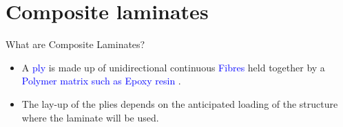 \documentclass[10pt,aspectratio=169,dvipsnames]{beamer} %
\begin{document}
\section{Composite laminates}
\begin{frame}{What are Composite Laminates?}
	\begin{minipage}[c]{.3\textwidth}
		\small
		\begin{itemize}
			\item A \textcolor{blue}{ply} is made up of unidirectional continuous \textcolor{blue}{Fibres} held together by a \textcolor{blue}{Polymer matrix such as Epoxy resin} .			
			\item The lay-up of the plies depends on the anticipated loading of the structure where the laminate will be used.
		\end{itemize}
	\end{minipage}
	\hfill
	\begin{minipage}[c]{.65\textwidth}
		\begin{figure}
		\end{figure}				
	\end{minipage}
\end{frame}
\end{document}

